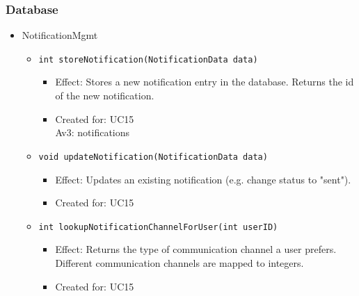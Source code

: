     \subsubsection{Database}
        \begin{itemize}
            \item NotificationMgmt
            \begin{itemize}
                \item \texttt{int storeNotification(NotificationData data)}
                \begin{itemize}
                    \item Effect: Stores a new notification entry in the database. Returns the id of the new notification.
                    \item Created for: UC15 \\
                          Av3: notifications
                \end{itemize}
                \item \texttt{void updateNotification(NotificationData data)}
                \begin{itemize}
                    \item Effect: Updates an existing notification (e.g. change status to "sent").
                    \item Created for: UC15
                \end{itemize}
                \item \texttt{int lookupNotificationChannelForUser(int userID)}
                \begin{itemize}
                    \item Effect: Returns the type of communication channel a user prefers.
                                  Different communication channels are mapped to integers.
                    \item Created for: UC15
                \end{itemize}
            \end{itemize}


\end{itemize}
